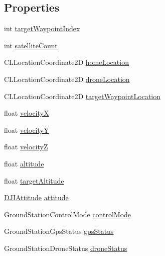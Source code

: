 \subsection*{Properties}
\begin{DoxyCompactItemize}
\item 
int \hyperlink{interface_d_j_i_ground_station_flying_info_a1ee65df6fec56e23c545f2a9bea7cf8b}{target\+Waypoint\+Index}
\item 
int \hyperlink{interface_d_j_i_ground_station_flying_info_aab354d5d7dbe977708da7976adf98452}{satellite\+Count}
\item 
C\+L\+Location\+Coordinate2\+D \hyperlink{interface_d_j_i_ground_station_flying_info_aa578b0630c020c9dbfb8a990fbe7a072}{home\+Location}
\item 
C\+L\+Location\+Coordinate2\+D \hyperlink{interface_d_j_i_ground_station_flying_info_aefaed815db457c38924ccae0a7ce4f7d}{drone\+Location}
\item 
C\+L\+Location\+Coordinate2\+D \hyperlink{interface_d_j_i_ground_station_flying_info_ac9a21f003ac25353be2de2e3505a17e5}{target\+Waypoint\+Location}
\item 
float \hyperlink{interface_d_j_i_ground_station_flying_info_ad8b985803c6a5bb238db09c9269d8691}{velocity\+X}
\item 
float \hyperlink{interface_d_j_i_ground_station_flying_info_a9e47f0ef8b8b59e2b7715cd186c41337}{velocity\+Y}
\item 
float \hyperlink{interface_d_j_i_ground_station_flying_info_a407350d0d50e83823e5ab856cb06d1d2}{velocity\+Z}
\item 
float \hyperlink{interface_d_j_i_ground_station_flying_info_a3a3af4721948773c4f003b129688dbd6}{altitude}
\item 
float \hyperlink{interface_d_j_i_ground_station_flying_info_a8a65f801952f96869b40cd3028ab54d4}{target\+Altitude}
\item 
\hyperlink{struct_d_j_i_attitude}{D\+J\+I\+Attitude} \hyperlink{interface_d_j_i_ground_station_flying_info_abd7294b2a74c6d5b1944cbad0801e732}{attitude}
\item 
Ground\+Station\+Control\+Mode \hyperlink{interface_d_j_i_ground_station_flying_info_a6a306041d30a49578feb95b33afe930e}{control\+Mode}
\item 
Ground\+Station\+Gps\+Status \hyperlink{interface_d_j_i_ground_station_flying_info_a2d16a3fe7607265429b2d9e435abe895}{gps\+Status}
\item 
Ground\+Station\+Drone\+Status \hyperlink{interface_d_j_i_ground_station_flying_info_ab43f7fde7a1b31650294e52eabc5ab23}{drone\+Status}
\end{DoxyCompactItemize}


